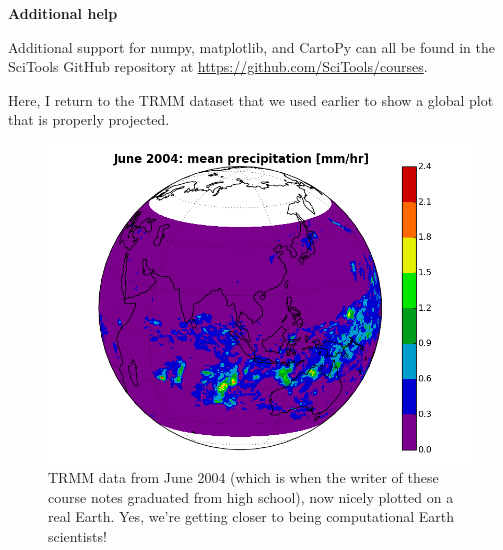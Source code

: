 \documentclass[a4paper,10pt]{scrartcl}
\begin{document}
\begin{framed}
\noindent\textbf{Additional help}

Additional support for numpy, matplotlib, and CartoPy can all be found in the SciTools GitHub repository at \url{https://github.com/SciTools/courses}.
\end{framed}

Here, I return to the TRMM dataset that we used earlier to show a global plot that is properly projected.



\begin{figure}[!ht]
\begin{center}
\includegraphics[width=.9\linewidth]{figures/FilesData/EasternHemispherePrecip.png}
\end{center}
\caption{TRMM data from June 2004 (which is when the writer of these course notes graduated from high school), now nicely plotted on a real Earth. Yes, we're getting closer to being computational Earth scientists!}
\end{figure}
\end{document}
